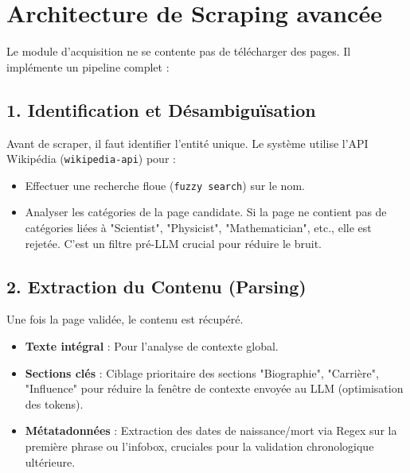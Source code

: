 \documentclass[12pt,a4paper]{report}
\begin{document}
\section{Architecture de Scraping avancée}
Le module d'acquisition ne se contente pas de télécharger des pages. Il implémente un pipeline complet :

\subsection{1. Identification et Désambiguïsation}
Avant de scraper, il faut identifier l'entité unique. Le système utilise l'API Wikipédia (\texttt{wikipedia-api}) pour :
\begin{itemize}
    \item Effectuer une recherche floue (\texttt{fuzzy search}) sur le nom.
    \item Analyser les catégories de la page candidate. Si la page ne contient pas de catégories liées à "Scientist", "Physicist", "Mathematician", etc., elle est rejetée. C'est un filtre pré-LLM crucial pour réduire le bruit.
\end{itemize}

\subsection{2. Extraction du Contenu (Parsing)}
Une fois la page validée, le contenu est récupéré.
\begin{itemize}
    \item \textbf{Texte intégral} : Pour l'analyse de contexte global.
    \item \textbf{Sections clés} : Ciblage prioritaire des sections "Biographie", "Carrière", "Influence" pour réduire la fenêtre de contexte envoyée au LLM (optimisation des tokens).
    \item \textbf{Métatadonnées} : Extraction des dates de naissance/mort via Regex sur la première phrase ou l'infobox, cruciales pour la validation chronologique ultérieure.
\end{itemize}
\end{document}

